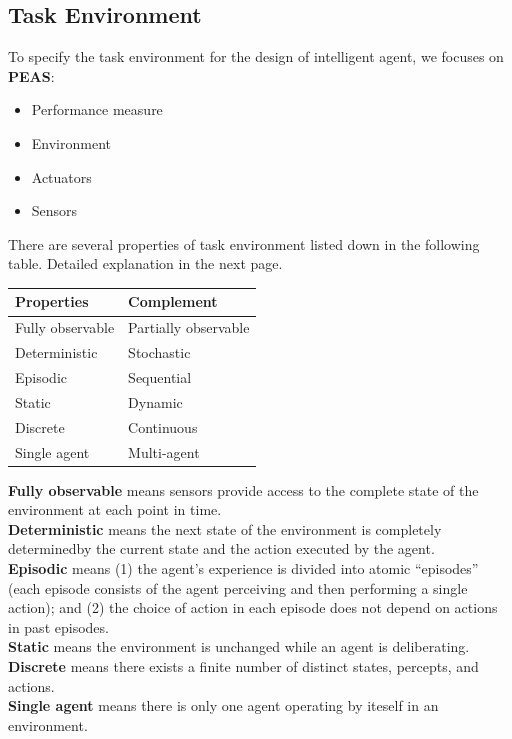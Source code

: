 \documentclass[12pt]{article}
\theoremstyle{definition}
\begin{document}
\subsection{Task Environment}
To specify the task environment for the design of intelligent agent, we focuses on \textbf{PEAS}:
\begin{itemize}
	\item Performance measure
	\item Environment
	\item Actuators
	\item Sensors
\end{itemize}
There are several properties of task environment listed down in the following table. Detailed explanation in the next page.
\begin{table}[h]
\centering
\begin{tabular}{|l|l|}
\hline
\textbf{Properties}&\textbf{Complement}\\\hline
Fully observable&Partially observable\\\hline
Deterministic&Stochastic\\\hline
Episodic&Sequential\\\hline
Static&Dynamic\\\hline
Discrete&Continuous\\\hline
Single agent&Multi-agent\\\hline
\end{tabular}
\end{table}
\clearpage
\textbf{Fully observable} means sensors provide access to the complete state of the environment at each point in time.\\
\textbf{Deterministic} means the next state of the environment is completely determinedby the current state and the action executed by the agent.\\
\textbf{Episodic} means (1) the agent’s experience is divided into atomic “episodes” (each episode consists of the agent perceiving and then performing a single action); and (2) the choice of action in each episode does not depend on actions in past episodes.\\
\textbf{Static} means the environment is unchanged while an agent is deliberating.\\
\textbf{Discrete} means there exists a finite number of distinct states, percepts, and actions.\\
\textbf{Single agent} means there is only one agent operating by iteself in an environment.
\end{document}
